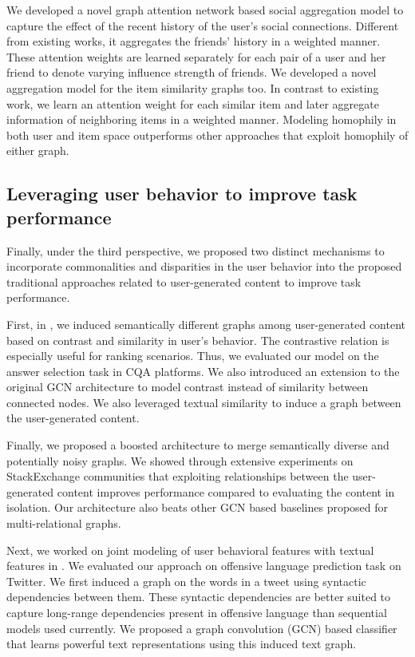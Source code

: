 We developed a novel graph attention network based social aggregation model to capture the effect of the recent history of the user's social connections. Different from existing works, it aggregates the friends' history in a weighted manner. These attention weights are learned separately for each pair of a user and her friend to denote varying influence strength of friends.
We developed a novel aggregation model for the item similarity graphs too. In contrast to existing work, we learn an attention weight for each similar item and later aggregate information of neighboring items in a weighted manner.
Modeling homophily in both user and item space outperforms other approaches that exploit homophily of either graph.

\subsection{Leveraging user behavior to improve task performance}
Finally, under the third perspective, we proposed two distinct mechanisms to incorporate commonalities and disparities in the user behavior into the proposed traditional approaches related to user-generated content to improve task performance.

First, in , we induced semantically different graphs among user-generated content based on contrast and similarity in user's behavior. The contrastive relation is especially useful for ranking scenarios. Thus, we evaluated our model on the answer selection task in CQA platforms. We also introduced an extension to the original GCN architecture to model contrast instead of similarity between connected nodes. We also leveraged textual similarity to induce a graph between the user-generated content.

Finally, we proposed a boosted architecture to merge semantically diverse and potentially noisy graphs. We showed through extensive experiments on StackExchange communities that exploiting relationships between the user-generated content improves performance compared to evaluating the content in isolation.
Our architecture also beats other GCN based baselines proposed for multi-relational graphs.

Next, we worked on joint modeling of user behavioral features with textual features in . We evaluated our approach on offensive language prediction task on Twitter. We first induced a graph on the words in a tweet using syntactic dependencies between them. These syntactic dependencies are better suited to capture long-range dependencies present in offensive language than sequential models used currently. We proposed a graph convolution (GCN) based classifier that learns powerful text representations using this induced text graph.

